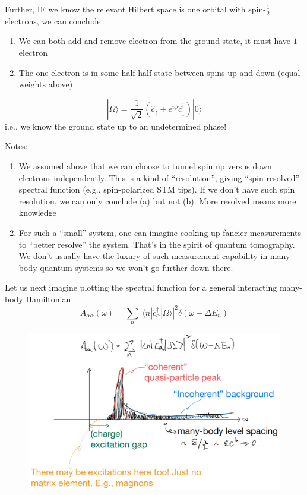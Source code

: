 Further, IF we know the relevant Hilbert space is one orbital with spin-$\frac{1}{2}$ electrons, we can conclude
\begin{enumerate}[label=(\alph*)]
    \item We can both add and remove electron from the ground state, it must have $1$ electron
    \item The one electron is in some half-half state between spins up and down (equal weights above)
\end{enumerate}
\[ |\Omega \rangle =\frac{1}{\sqrt{2}}\left( \hat{c}_{\uparrow}^{\dagger}+e^{i\phi}\hat{c}_{\downarrow}^{\dagger} \right) |0\rangle \]
i.e., we know the ground state up to an undetermined phase!

Notes:
\begin{enumerate}
    \item We assumed above that we can choose to tunnel spin up versus down electrons independently. This is a kind of ``resolution'', giving ``spin-resolved'' spectral function (e.g., spin-polarized STM tips). If we don't have such spin resolution, we can only conclude (a) but not (b). More resolved means more knowledge
    \item For such a ``small'' system, one can imagine cooking up fancier measurements to ``better resolve'' the system. That's in the spirit of quantum tomography. We don't usually have the luxury of such measurement capability in many-body quantum systems so we won't go further down there.
\end{enumerate}

Let us next imagine plotting the spectral function for a general interacting many-body Hamiltonian
\[ A_{\alpha \alpha}\left( \omega \right) =\sum_n{\left| \langle n|\hat{c}_{\alpha}^{\dagger}|\Omega \rangle \right|^2\delta \left( \omega -\Delta E_n \right)}\]

\begin{figure}[ht]
    \centering
    \includegraphics[width=\textwidth]{jupyterbook/data/fig/lec05-fig06.png}
\end{figure}

